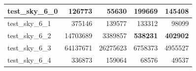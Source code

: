 \documentclass{article}
\begin{document}
\begin{table}[H]
\begin{center}
\begin{tabular}{|l|r|r|r|r|}
				test\_sky\_6\_0 & 126773                           & 55630                            & 199669                                 & 145408                                 \\ \hline
				test\_sky\_6\_1 & 375146                           & 139577                           & 133312                                 & 98099                                  \\ \hline
				test\_sky\_6\_2 & 14703689                         & 3389857                          & \textbf{538231}                        & \textbf{402902}                        \\ \hline
				test\_sky\_6\_3 & 64137671                         & 26275623                         & 6758373                                & 4955527                                \\ \hline
				test\_sky\_6\_4 & 336873                           & 159064                           & 68576                                  & 49537                                  \\ \hline
			\end{tabular}
		\end{center}
	\end{table}
\end{document}
